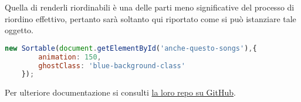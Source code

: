 Quella di renderli riordinabili è una delle parti meno significative del processo di riordino effettivo, pertanto sarà soltanto qui riportato come si può istanziare tale oggetto.
\begin{lstlisting}[language=JavaScript]
new Sortable(document.getElementById('anche-questo-songs'),{
        animation: 150,
        ghostClass: 'blue-background-class'
    });
\end{lstlisting}

Per ulteriore documentazione si consulti \href{https://github.com/SortableJS/Sortable}{la loro repo su GitHub}.
\newpage